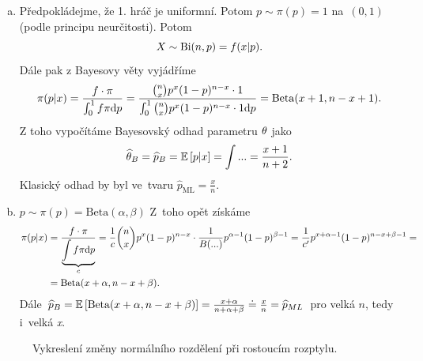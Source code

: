 \begin{example}
	\begin{enumerate}[a)]
		\item Předpokládejme, že 1. hráč je uniformní. Potom $p\sim\pi(p)=1$ na~$(0,1)$ (podle principu neurčitosti). Potom
		$$ X\sim\mathrm{Bi}(n,p)=f(x|p).$$
		Dále pak z Bayesovy věty vyjádříme
		$$ \pi(p|x)=\frac{f\cdot\pi}{\int_0^1 f\pi\mathrm{d} p}=\frac{\binom{n}{x}p^x(1-p)^{n-x}\cdot 1}{\int_0^1 \binom{n}{x}p^x(1-p)^{n-x}\cdot1 \mathrm{d} p}=\mathrm{Beta}(x+1,n-x+1).$$
		Z toho vypočítáme Bayesovský odhad parametru $\theta$ jako
		$$ \widehat{\theta}_B=\widehat{p}_B=\mathbb{E}\left[ p|x \right]=\int...=\frac{x+1}{n+2}.$$
		Klasický odhad by byl ve~tvaru $\widehat{p}_{\mathrm{ML}}=\frac{x}{n}$.
		\item $p\sim \pi(p)=\mathrm{Beta}(\alpha,\beta)$ Z~toho opět získáme 
		\[
		\begin{split}
		\pi(p|x)&=\frac{f\cdot\pi}{\underbrace{\int f\pi\mathrm{d} p}_c}=\frac{1}{c}\binom{n}{x}p^x(1-p)^{n-x}\cdot \frac{1}{B(...)}p^{\alpha-1}(1-p)^{\beta-1}=\frac{1}{c'}p^{x+\alpha-1}(1-p)^{n-x+\beta-1}=\\&=\mathrm{Beta}(x+\alpha,n-x+\beta).
		\end{split}
		\] 
		Dále
		$\widehat{p}_B=\mathbb{E}\left[ \mathrm{Beta}(x+\alpha,n-x+\beta) \right]=\frac{x+\alpha}{n+\alpha+\beta}\doteq\frac{x}{n} = \widehat{p}_{ML}$ pro velká $n$, tedy i~velká \textit{x}.
	\end{enumerate}
\end{example}

\begin{figure}[h]
	\centering
	\caption{Vykreslení změny normálního rozdělení při rostoucím rozptylu.}
\end{figure}

